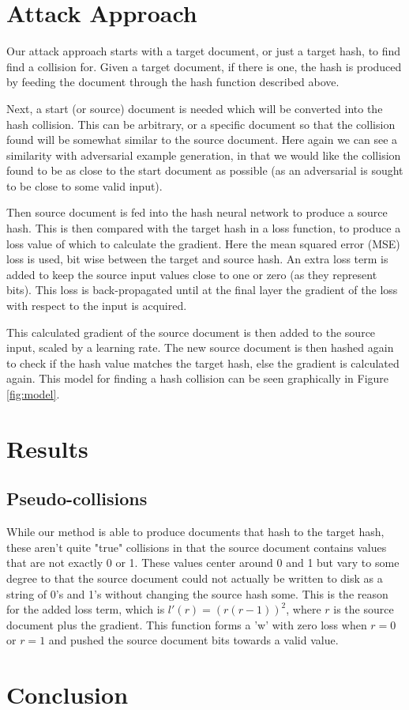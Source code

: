 \documentclass{article}
\begin{document}
\section{Attack Approach}

Our attack approach starts with a target document, or just a target hash, to
find find a collision for. Given a target document, if there is one, the hash
is produced by feeding the document through the hash function described above.

Next, a start (or source) document is needed which will be converted into the
hash collision.  This can be arbitrary, or a specific document so that the
collision found will be somewhat similar to the source document. Here again we
can see a similarity with adversarial example generation, in that we would like
the collision found to be as close to the start document as possible (as an
adversarial is sought to be close to some valid input).

Then source document is fed into the hash neural network to produce a source hash.
This is then compared with the target hash in a loss function, to produce a loss
value of which to calculate the gradient. Here the mean squared error (MSE) loss
is used, bit wise between the target and source hash. An extra loss term is
added to keep the source input values close to one or zero (as they represent bits).
This loss is back-propagated until at the final layer the gradient of the loss
with respect to the input is acquired.

This calculated gradient of the source document is then added to the source
input, scaled by a learning rate. The new source document is then hashed again
to check if the hash value matches the target hash, else the gradient is
calculated again.  This model for finding a hash collision can be seen
graphically in Figure \ref{fig:model}.

\section{Results}

\subsection{Pseudo-collisions}
While our method is able to produce documents that hash to the target hash, these
aren't quite "true" collisions in that the source document contains values that
are not exactly 0 or 1. These values center around 0 and 1 but vary to some degree
to that the source document could not actually be written to disk as a string of 0's
and 1's without changing the source hash some. This is the reason for the added
loss term, which is $l'(r) = (r (r - 1))^2$, where $r$ is the source document
plus the gradient. This function  forms a 'w' with zero loss when $r = 0$ or
$r = 1$ and pushed the source document bits towards a valid value.

\section{Conclusion}


 
\end{document}
